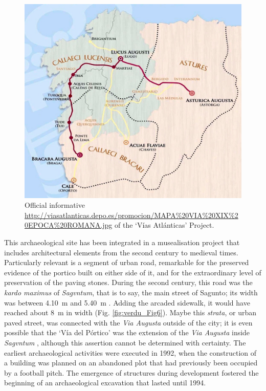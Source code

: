 	\begin{figure}[!htb]
		\includegraphics[width=\linewidth]{figures/verdu_Fig5}
		\caption{Official informative \url{http://viasatlanticas.depo.es/promocion/MAPA\%20VIA\%20XIX\%20EPOCA\%20ROMANA.jpg} of the ‘Vías Atlánticas’ Project.}
		\label{fig:verdu_Fig5}
	\end{figure}	
\noindent This archaeological site has been integrated in a musealisation project that includes architectural elements from the second century to medieval times. Particularly relevant is a segment of urban road, remarkable for the preserved evidence of the portico built on either side of it, and for the extraordinary level of preservation of the paving stones. During the second century, this road was the \textit{kardo maximus} of \textit{Sagvntum}, that is to say, the main street of Sagunto; its width was between \SI{4.10}{\meter} and \SI{5.40}{\meter}  \parencite[15--17]{Melchor_2005a}. Adding the arcaded sidewalk, it would have reached about \SI{8}{\meter} in width (Fig. \ref{fig:verdu_Fig6}). Maybe this \textit{strata}, or urban paved street, was connected with the \textit{Via Augusta} outside of the city; it is even possible that the ‘Vía del Pórtico’ was the extension of the \textit{Via Augusta} inside \textit{Sagvntum} \parencite[15]{Melchor_2005a}, although this assertion cannot be determined with certainty. The earliest archaeological activities were executed in 1992, when the construction of a building was planned on an abandoned plot that had previously been occupied by a football pitch. The emergence of structures during development fostered the beginning of an archaeological excavation that lasted until 1994.

